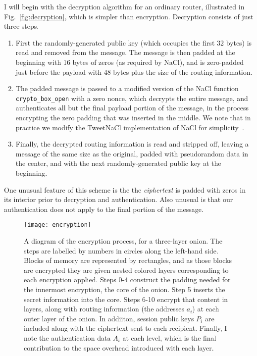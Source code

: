 \documentclass[letterpaper,twocolumn,amsmath,amssymb,pre,aps,10pt]{revtex4-1}
\begin{document}
I will begin with the decryption algorithm for an ordinary router,
illustrated in Fig.~\ref{fig:decryption}, which is simpler than
encryption.  Decryption consists of just three steps.
\begin{enumerate}
\item First the randomly-generated public key (which occupies the
  first 32 bytes) is read and removed from the message.  The message
  is then padded at the beginning with 16 bytes of zeros (as required
  by NaCl), and is zero-padded just before the payload with 48 bytes
  plus the size of the routing information.
\item The padded message is passed to a modified version of the NaCl
  function \verb!crypto_box_open! with a zero nonce, which decrypts
  the entire message, and authenticates all but the final payload
  portion of the message, in the process encrypting the zero padding
  that was inserted in the middle.  We note that in practice we modify
  the TweetNaCl implementation of NaCl for
  simplicity~\cite{bernstein2014tweetnacl}.
\item Finally, the decrypted routing information is read and stripped
  off, leaving a message of the same size as the original, padded with
  pseudorandom data in the center, and with the next
  randomly-generated public key at the beginning.
\end{enumerate}
One unusual feature of this scheme is the the \emph{ciphertext} is
padded with zeros in its interior prior to decryption and
authentication.  Also unusual is that our authentication does not
apply to the final portion of the message.

\begin{figure*}
  \begin{center}
    \texttt{[image: encryption]}
  \end{center}
  \caption{A diagram of the encryption process, for a three-layer
    onion.  The steps are labelled by numbers in circles along the
    left-hand side. Blocks of memory are represented by rectangles,
    and as those blocks are encrypted they are given nested colored
    layers corresponding to each encryption applied.  Steps 0-4
    construct the padding needed for the innermost encryption, the
    core of the onion.  Step 5 inserts the secret information into the
    core.  Steps 6-10 encrypt that content in layers, along with
    routing information (the addresses $a_i$) at each outer layer of
    the onion.  In addiiton, session public keys $P_i$ are included
    along with the ciphertext sent to each recipient.  Finally, I
    note the authentication data $A_i$ at each level, which is the
    final contribution to the space overhead introduced with each
    layer.}\label{fig:algorithm}
\end{figure*}
\end{document}
